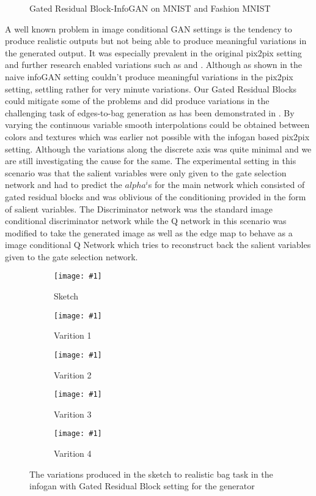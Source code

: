 \begin{figure}%
    \centering
    \caption{Gated Residual Block-InfoGAN on MNIST and Fashion MNIST}
    \label{fig:infogan_unconditional}
    \vspace{-3mm}
\end{figure}

A well known problem in image conditional GAN settings is the tendency to produce realistic outputs but not being able to produce meaningful variations in the generated output. It was especially prevalent in the original pix2pix setting \cite{isola2016image2image} and further research enabled variations such as \cite{ghosh2017multi} and \cite{zhu2017toward}. Although as shown in \cite{ghosh2017multi} the naive infoGAN setting couldn't produce meaningful variations in the pix2pix setting, settling rather for very minute variations. Our Gated Residual Blocks could mitigate some of the problems and did produce variations in the challenging task of edges-to-bag generation as has been demonstrated in . By varying the continuous variable smooth interpolations could be obtained between colors and textures which was earlier not possible with the infogan based pix2pix setting. Although the variations along the discrete axis was quite minimal and we are still investigating the cause for the same. The experimental setting in this scenario was that the salient variables were only given to the gate selection network and had to predict the $alpha^i$s for the main network which consisted of gated residual blocks and was oblivious of the conditioning provided in the form of salient variables. The Discriminator network was the standard image conditional discriminator network while the Q network in this scenario was modified to take the generated image as well as the edge map to behave as a image conditional Q Network which tries to reconstruct back the salient variables given to the gate selection network. 

\newcommand{\addSubFigEighth}[3]{\begin{subfigure}[t]{.18\linewidth}
   \texttt{[image: \#1]}
   \caption{#2}\label{#3}\end{subfigure}
}
\begin{figure*}%
    \centering
    \addSubFigEighth{Picture8}{Sketch}{fig:bag_sketch} 
    \addSubFigEighth{Picture9}{Varition 1}{fig:bag_1} 
    \addSubFigEighth{Picture10}{Varition 2}{fig:bag_2}
    \addSubFigEighth{Picture11}{Varition 3}{fig:bag_3}
    \addSubFigEighth{Picture12}{Varition 4}{fig:bag_4}
    \caption{The variations produced in the sketch to realistic bag task in the infogan with Gated Residual Block setting for the generator }
    \label{fig:infogan_bags}
    \vspace{-3mm}
\end{figure*}

